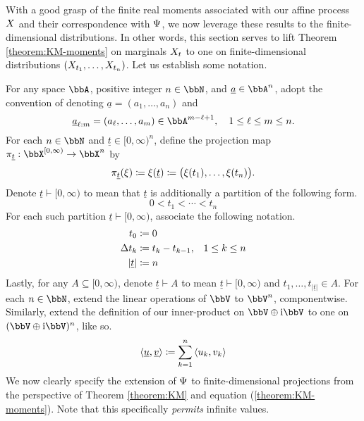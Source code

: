With a good grasp of the finite real moments associated with our affine process $X$ and their correspondence with $\Psi$, we now leverage these results to the finite-dimensional distributions.
In other words, this section serves to lift Theorem \ref{theorem:KM-moments} on marginals $X_t$ to one on finite-dimensional distributions $(X_{t_1}, \ldots, X_{t_n})$.
Let us establish some notation.

For any space $\bbA$, positive integer $n\in\bbN$, and $\underline a \in \bbA^n$, adopt the convention of denoting $\underline a = (a_1, \ldots, a_n)$ and 
\begin{equation*}
  \underline a_{\ell:m} = (a_\ell,\ldots,a_m) \in \bbA^{m-\ell+1}, \quad 1 \leq \ell \leq m \leq n.
\end{equation*}
For each $n\in \bbN$ and $\underline t \in [0,\infty)^n$, define the projection map $\pi_{\underline t}: \stateSpace^{[0,\infty)} \rightarrow \stateSpace^n$ by
\begin{equation*}
  \pi_{\underline t}(\xi) \coloneqq \xi(\underline t) \coloneqq \big( \xi(t_1), \ldots, \xi(t_n) \big).
\end{equation*}
Denote $\underline t \vdash [0,\infty)$ to mean that $\underline t$ is additionally a partition of the following form.
\begin{equation*}
  0 < t_1 < \cdots < t_n
\end{equation*}
For each such partition $\underline t \vdash [0,\infty)$, associate the following notation.
\begin{align*}
  t_0 &\coloneqq 0 \\
  \Delta t_k &\coloneqq t_k - t_{k-1}, & 1 \leq k \leq n \\
  |\underline t| &\coloneqq n
\end{align*}
Lastly, for any $A \subseteq [0,\infty)$, denote $\underline t \vdash A$ to mean $\underline t \vdash [0,\infty)$ and $t_1,\ldots,t_{|\underline t|} \in A$.
For each $n \in \bbN$, extend the linear operations of $\vecSpace$ to $\vecSpace^n$, componentwise.
Similarly, extend the definition of our inner-product on $\vecSpace \oplus \im\vecSpace$ to one on $(\vecSpace \oplus \im\vecSpace)^n$, like so.
\begin{equation*}
  {\langle \underline{u}, \underline{v}\rangle} \coloneqq \sum_{k=1}^n {\langle u_k , v_k \rangle}
\end{equation*}
We now clearly specify the extension of $\Psi$ to finite-dimensional projections from the perspective of Theorem \ref{theorem:KM} and equation (\ref{theorem:KM-moments}).
Note that this specifically \emph{permits} infinite values.

